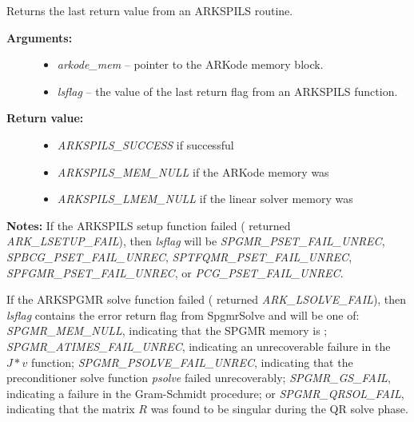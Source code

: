 \documentclass[letterpaper,10pt,english]{sphinxmanual}
\begin{document}
\begin{fulllineitems}
\label{c_interface/User_callable:c.ARKSpilsGetLastFlag}
Returns the last return value from an ARKSPILS routine.
\begin{description}
\item[{\textbf{Arguments:}}] \leavevmode\begin{itemize}
\item {} 
\emph{arkode\_mem} -- pointer to the ARKode memory block.

\item {} 
\emph{lsflag} -- the value of the last return flag from an
ARKSPILS function.

\end{itemize}

\item[{\textbf{Return value:}}] \leavevmode\begin{itemize}
\item {} 
\emph{ARKSPILS\_SUCCESS} if successful

\item {} 
\emph{ARKSPILS\_MEM\_NULL} if the ARKode memory was 

\item {} 
\emph{ARKSPILS\_LMEM\_NULL} if the linear solver memory was 

\end{itemize}

\end{description}

\textbf{Notes:} If the ARKSPILS setup function failed ({\hyperref[c_interface/User_callable:c.ARKode]{\emph{}}}
returned \emph{ARK\_LSETUP\_FAIL}), then \emph{lsflag} will be
\emph{SPGMR\_PSET\_FAIL\_UNREC}, \emph{SPBCG\_PSET\_FAIL\_UNREC},
\emph{SPTFQMR\_PSET\_FAIL\_UNREC}, \emph{SPFGMR\_PSET\_FAIL\_UNREC}, or
\emph{PCG\_PSET\_FAIL\_UNREC}.

If the ARKSPGMR solve function failed ({\hyperref[c_interface/User_callable:c.ARKode]{\emph{}}}
returned \emph{ARK\_LSOLVE\_FAIL}), then \emph{lsflag} contains the error
return flag from SpgmrSolve and will be one of:
\emph{SPGMR\_MEM\_NULL}, indicating that the SPGMR memory is
; \emph{SPGMR\_ATIMES\_FAIL\_UNREC}, indicating an unrecoverable
failure in the \(J*v\) function; \emph{SPGMR\_PSOLVE\_FAIL\_UNREC},
indicating that the preconditioner solve function \emph{psolve} failed
unrecoverably; \emph{SPGMR\_GS\_FAIL}, indicating a failure in the
Gram-Schmidt procedure; or \emph{SPGMR\_QRSOL\_FAIL}, indicating that
the matrix \(R\) was found to be singular during the QR solve
phase.


\end{fulllineitems}
\end{document}
